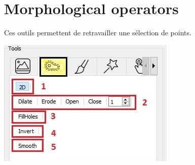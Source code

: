 \documentclass {article}
\begin{document}
\section{Morphological operators}

Ces outils permettent de retravailler une sélection de points.

\begin{center}
			\includegraphics{Iconographie/morphological_operator.jpg}
\end{center}
\end{document}
